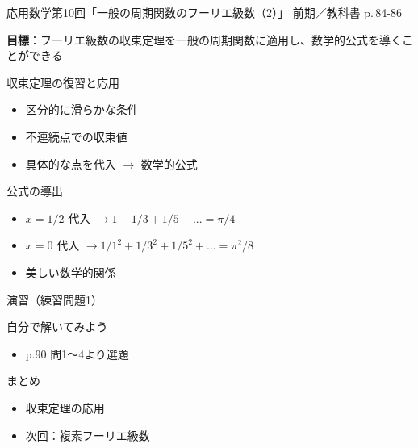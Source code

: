 \documentclass[aspectratio=43,professionalfonts,handout]{beamer}
\newcommand{\LectureNum}{10}
\newcommand{\LectureTitle}{一般の周期関数のフーリエ級数（2）}
\newcommand{\TextPages}{p.\,84-86}
\newcommand{\CourseName}{応用数学}
\renewcommand{\TermName}{前期}
\begin{document}
\begin{frame}{\CourseName\quad 第\LectureNum 回「\LectureTitle」}
  {\small \TermName\quad \TeacherName\quad ／\quad 教科書 \TextPages}

  \textbf{目標}：フーリエ級数の収束定理を一般の周期関数に適用し、数学的公式を導くことができる

\end{frame}

\begin{frame}{収束定理の復習と応用}
  \begin{block}{}
  \begin{itemize}
    \item 区分的に滑らかな条件
    \item 不連続点での収束値
    \item 具体的な点を代入 $ \to $ 数学的公式
  \end{itemize}
  \end{block}
\end{frame}

\begin{frame}{公式の導出}
  \begin{block}{}
  \begin{itemize}
    \item $x=1/2$ 代入 $ \to 1-1/3+1/5-... = \pi/4$
    \item $x=0$ 代入 $ \to 1/1^{2}+1/3^{2}+1/5^{2}+... = \pi^{2}/8$
    \item 美しい数学的関係
  \end{itemize}
  \end{block}
\end{frame}

\begin{frame}{演習（練習問題1）}
  \begin{exampleblock}{自分で解いてみよう}
  \begin{itemize}
    \item p.90 問1〜4より選題
  \end{itemize}
  \end{exampleblock}
\end{frame}

\begin{frame}{まとめ}
  \begin{itemize}
    \item 収束定理の応用
    \item 次回：複素フーリエ級数
  \end{itemize}
\end{frame}
\end{document}
